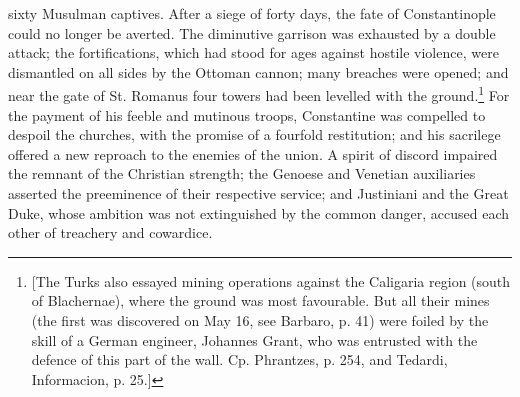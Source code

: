 sixty Musulman captives. After a siege of forty days, the fate of Constantinople could no longer be averted. The diminutive garrison was exhausted by a double attack; the fortifications, which had stood for ages against hostile violence, were dismantled on all sides by the Ottoman cannon; many breaches were opened; and near the gate of St. Romanus four towers had been levelled with the ground.\footnote{[The Turks also essayed mining operations against the Caligaria region (south of Blachernae), where the ground was most favourable. But all their mines (the first was discovered on May 16, see Barbaro, p. 41) were foiled by the skill of a German engineer, Johannes Grant, who was entrusted with the defence of this part of the wall. Cp. Phrantzes, p. 254, and Tedardi, Informacion, p. 25.]} For the payment of his feeble and mutinous troops, Constantine was compelled to despoil the churches, with the promise of a fourfold restitution; and his sacrilege offered a new reproach to the enemies of the union. A spirit of discord impaired the remnant of the Christian strength; the Genoese and Venetian auxiliaries asserted the preeminence of their respective service; and Justiniani and the Great Duke, whose ambition was not extinguished by the common danger, accused each other of treachery and cowardice.

